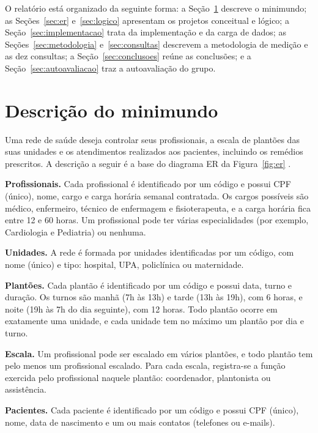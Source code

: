 \documentclass[10pt,a4paper]{article}
\begin{document}
O relatório está organizado da seguinte forma: a Seção~\ref{sec:minimundo} descreve o minimundo; as Seções~\ref{sec:er} e~\ref{sec:logico} apresentam os projetos conceitual e lógico; a Seção~\ref{sec:implementacao} trata da implementação e da carga de dados; as Seções~\ref{sec:metodologia} e~\ref{sec:consultas} descrevem a metodologia de medição e as dez consultas; a Seção~\ref{sec:conclusoes} reúne as conclusões; e a Seção~\ref{sec:autoavaliacao} traz a autoavaliação do grupo.

\section{Descrição do minimundo}\label{sec:minimundo}

Uma rede de saúde deseja controlar seus profissionais, a escala de plantões das suas unidades e os atendimentos realizados aos pacientes, incluindo os remédios prescritos. A descrição a seguir é a base do diagrama ER da Figura~\ref{fig:er} \cite{elmasri}.

\textbf{Profissionais.} Cada profissional é identificado por um código e possui CPF (único), nome, cargo e carga horária semanal contratada. Os cargos possíveis são médico, enfermeiro, técnico de enfermagem e fisioterapeuta, e a carga horária fica entre 12 e 60 horas. Um profissional pode ter várias especialidades (por exemplo, Cardiologia e Pediatria) ou nenhuma.

\textbf{Unidades.} A rede é formada por unidades identificadas por um código, com nome (único) e tipo: hospital, UPA, policlínica ou maternidade.

\textbf{Plantões.} Cada plantão é identificado por um código e possui data, turno e duração. Os turnos são manhã (7h às 13h) e tarde (13h às 19h), com 6 horas, e noite (19h às 7h do dia seguinte), com 12 horas. Todo plantão ocorre em exatamente uma unidade, e cada unidade tem no máximo um plantão por dia e turno.

\textbf{Escala.} Um profissional pode ser escalado em vários plantões, e todo plantão tem pelo menos um profissional escalado. Para cada escala, registra-se a função exercida pelo profissional naquele plantão: coordenador, plantonista ou assistência.

\textbf{Pacientes.} Cada paciente é identificado por um código e possui CPF (único), nome, data de nascimento e um ou mais contatos (telefones ou e-mails).
\end{document}
